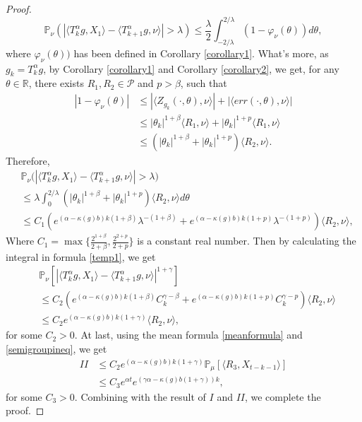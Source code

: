 \documentclass{article}
\begin{document}
\begin{proof}
$$\mathbb{P}_{\nu}\left(|\langle T_k^{\alpha}g, X_1\rangle-\langle T_{k+1}^{\alpha}g,\nu\rangle|>\lambda\right)\leq \frac{\lambda}{2}\int_{-2/\lambda}^{2/\lambda}(1-\varphi_{\nu}(\theta))d\theta,$$
where $\varphi_{\nu}(\theta))$ has been defined in Corollary \eqref{corollary1}. What's more, as $g_k=T_k^{\alpha}g$, by Corollary \eqref{corollary1} and Corollary \eqref{corollary2}, we get, for any $\theta\in\mathbb{R}$, there exists $R_1,R_2 \in \mathcal{P}$ and $p>\beta$, such that 
\begin{align*}
    |1-\varphi_{\nu}(\theta)|&\leq|\langle Z_{g_k}(\cdot,\theta),\nu \rangle|+|\langle err(\cdot,\theta),\nu \rangle|\\
    &\leq|\theta_k|^{1+\beta}\langle R_1,\nu\rangle+|\theta_k|^{1+p}\langle R_1, \nu \rangle\\
    &\leq (|\theta_k|^{1+\beta}+|\theta_k|^{1+p})\langle R_2, \nu \rangle.
\end{align*}
Therefore,
\begin{align*}
    &\mathbb{P}_{\nu}\big(|\langle T_k^{\alpha}g, X_1 \rangle-\langle T_{k+1}^{\alpha}g,\nu\rangle|>\lambda\big)\\
    &\leq\lambda\int_0^{2/\lambda}(|\theta_k|^{1+\beta}+|\theta_k|^{1+p})\langle R_2, \nu \rangle d\theta\\
    &\leq C_1(e^{(\alpha-\kappa(g)b)k(1+\beta)}\lambda^{-(1+\beta)}+e^{(\alpha-\kappa(g)b)k(1+p)}\lambda^{-(1+p)})\langle R_2,\nu \rangle,
\end{align*}
Where $C_1=\max\{\frac{2^{1+\beta}}{2+\beta}, \frac{2^{2+p}}{2+p}\}$ is a constant real number. Then by calculating the integral in formula \eqref{temp1}, we get
\begin{align*}
    &\mathbb{P}_{\nu}\left[|\langle T_k^{\alpha}g, X_1\rangle-\langle T_{k+1}^{\alpha}g,\nu\rangle|^{1+\gamma} \right] \\
    &\leq C_2\left(e^{(\alpha-\kappa(g)b)k(1+\beta)}C_k^{\gamma-\beta}+e^{(\alpha-\kappa(g)b)k(1+p)}C_k^{\gamma-p}\right)\langle R_2,\nu\rangle\\
    &\leq C_2 e^{(\alpha-\kappa(g)b)k(1+\gamma)}\langle R_2,\nu\rangle,
\end{align*}
for some $C_2>0$. At last, using the mean formula \eqref{meanformula} and \eqref{semigroupineq}, we get
\begin{align*}
    II &\leq C_2e^{(\alpha-\kappa(g)b)k(1+\gamma)}\mathbb{P}_{\mu}\left[\langle R_3,X_{t-k-1}\rangle\right]\\
       &\leq C_3e^{\alpha t}e^{(\gamma\alpha-\kappa(g)b(1+\gamma))k},
\end{align*}
for some $C_3>0$. Combining with the result of $I$ and $II$, we complete the proof.
\end{proof}
\end{document}
